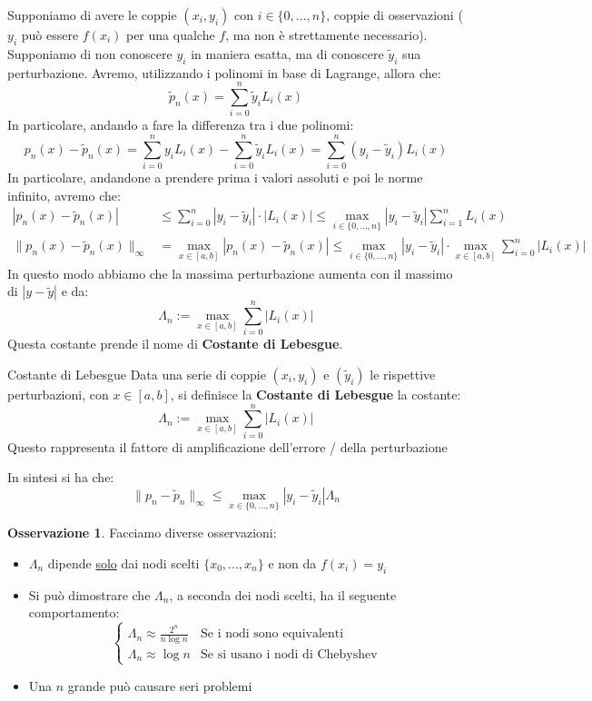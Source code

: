 \documentclass[11pt,a4paper,twoside]{article}
\theoremstyle{definition}
\newtheorem*{oss}{Osservazione}
\begin{document}
Supponiamo di avere le coppie $(x_i,y_i)$ con $i \in \{0,...,n\}$, coppie di osservazioni ($y_i$ può essere $f(x_i)$ per una qualche $f$, ma non è strettamente necessario). Supponiamo di non conoscere $y_i$ in maniera esatta, ma di conoscere $\tilde y_i$ sua perturbazione. Avremo, utilizzando i polinomi in base di Lagrange, allora che:
\[ \tilde p_n(x) = \sum_{i = 0}^n \tilde y_i L_i(x) \]
In particolare, andando a fare la differenza tra i due polinomi:
\[ p_n(x) - \tilde p_n(x) = \sum_{i = 0}^n y_i L_i(x) - \sum_{i = 0}^n \tilde y_i L_i(x) = \sum_{i = 0}^n (y_i - \tilde y_i)L_i(x)\]
In particolare, andandone a prendere prima i valori assoluti e poi le norme infinito, avremo che:
\begin{align*}
	|p_n(x) - \tilde p_n(x)| &\leq \sum_{i = 0}^n |y_i - \tilde y_i| \cdot |L_i(x)| \leq \max_{i \in \{0,...,n\}} |y_i - \tilde y_i| \sum_{i = 1}^n L_i(x)\\
	\|p_n(x) - \tilde p_n(x) \|_\infty &= \max_{x \in [a,b]} |p_n(x) - \tilde p_n(x)| \leq \max_{i \in \{0,...,n\}}|y_i - \tilde y_i| \cdot \max_{x \in [a,b]} \sum_{i = 0}^n |L_i(x)|
\end{align*}
In questo modo abbiamo che la massima perturbazione aumenta con il massimo di $|y - \tilde y|$ e da:
\[ \Lambda_n := \max_{x \in [a,b]} \sum_{i = 0}^n |L_i(x)| \]
Questa costante prende il nome di \textbf{Costante di Lebesgue}.

\begin{defn}{Costante di Lebesgue}{}
	Data una serie di coppie $(x_i, y_i)$ e $(\tilde y_i)$ le rispettive perturbazioni, con $x \in [a,b]$, si definisce la \textbf{Costante di Lebesgue} la costante:
	\[ \Lambda_n := \max_{x \in [a,b]} \sum_{i = 0}^n|L_i(x)|\]
	Questo rappresenta il fattore di amplificazione dell'errore / della perturbazione
\end{defn}

In sintesi si ha che:
\[ \|p_n - \tilde p_n\|_\infty \leq \max_{x \in \{0,...,n\}} |y_i - \tilde y_i| \Lambda_n \]

\begin{oss}
	Facciamo diverse osservazioni:
	\begin{itemize}
		\item $\Lambda_n$ dipende \underline{solo} dai nodi scelti $\{x_0,...,x_n\}$ e non da $f(x_i) = y_i$
		\item Si può dimostrare che $\Lambda_n$, a seconda dei nodi scelti, ha il seguente comportamento:
			\[\begin{cases}
				\Lambda_n \approx \frac{2^n}{n \log n} & \text{Se i nodi sono equivalenti}\\
				\Lambda_n \approx \log n & \text{Se si usano i nodi di Chebyshev}
			\end{cases}\]
		\item Una $n$ grande può causare seri problemi
	\end{itemize}
\end{oss}
\end{document}
